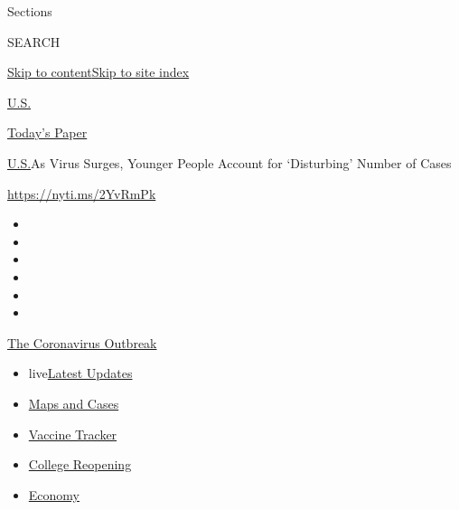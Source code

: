 Sections

SEARCH

\protect\hyperlink{site-content}{Skip to
content}\protect\hyperlink{site-index}{Skip to site index}

\href{https://www.nytimes.com/section/us}{U.S.}

\href{https://myaccount.nytimes.com/auth/login?response_type=cookie\&client_id=vi}{}

\href{https://www.nytimes.com/section/todayspaper}{Today's Paper}

\href{/section/us}{U.S.}\textbar{}As Virus Surges, Younger People
Account for `Disturbing' Number of Cases

\url{https://nyti.ms/2YvRmPk}

\begin{itemize}
\item
\item
\item
\item
\item
\item
\end{itemize}

\href{https://www.nytimes.com/news-event/coronavirus?action=click\&pgtype=Article\&state=default\&region=TOP_BANNER\&context=storylines_menu}{The
Coronavirus Outbreak}

\begin{itemize}
\tightlist
\item
  live\href{https://www.nytimes.com/2020/08/04/world/coronavirus-cases.html?action=click\&pgtype=Article\&state=default\&region=TOP_BANNER\&context=storylines_menu}{Latest
  Updates}
\item
  \href{https://www.nytimes.com/interactive/2020/us/coronavirus-us-cases.html?action=click\&pgtype=Article\&state=default\&region=TOP_BANNER\&context=storylines_menu}{Maps
  and Cases}
\item
  \href{https://www.nytimes.com/interactive/2020/science/coronavirus-vaccine-tracker.html?action=click\&pgtype=Article\&state=default\&region=TOP_BANNER\&context=storylines_menu}{Vaccine
  Tracker}
\item
  \href{https://www.nytimes.com/2020/08/02/us/covid-college-reopening.html?action=click\&pgtype=Article\&state=default\&region=TOP_BANNER\&context=storylines_menu}{College
  Reopening}
\item
  \href{https://www.nytimes.com/live/2020/08/04/business/stock-market-today-coronavirus?action=click\&pgtype=Article\&state=default\&region=TOP_BANNER\&context=storylines_menu}{Economy}
\end{itemize}

